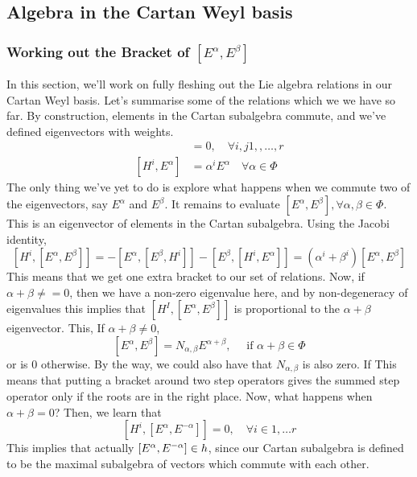 \subsection{Algebra in the Cartan Weyl basis}

\subsubsection{Working out the Bracket of $ \left[  E ^ \alpha, E ^ \beta  \right]  $}
In this section, we'll work on fully fleshing 
out the Lie algebra relations in our Cartan Weyl basis. 
Let's summarise some of the relations which we we have so far. 
By construction, elements in the Cartan subalgebra commute, 
and we've defined eigenvectors with weights. 
\begin{align*}
	[ H ^ i , H ^ j ] &=  0 , \quad \forall i , j   1, , \dots, r  \\ 
	[ H ^ i , E ^ \alpha ] & = \alpha ^ i E ^ \alpha \quad \forall \alpha \in \Phi 
\end{align*}
The only thing we've yet to do 
is explore what happens when we 
commute two of the eigenvectors, say $  E^ \alpha$ and $ E ^ \beta $. 
It remains to evaluate $ [ E ^ \alpha , E ^ \beta ] , \forall \alpha, \beta \in \Phi$.
This is an eigenvector of elements in the Cartan subalgebra. 
Using the Jacobi identity, 
 \[
 [ H ^ i , [ E ^ \alpha, E ^ \beta ] ] =  - [ E ^ \alpha , [ E ^ \beta , H ^ i ]] - [ E ^ \beta , 
 [ H ^ i , E ^ \alpha ] ]  = ( \alpha ^ i + \beta ^ i ) [ E ^ \alpha , E ^ \beta ] 
\] 
This means that we get one extra bracket to our set of relations.
Now, if $ \alpha + \beta \neq  = 0  $, then we 
have a non-zero eigenvalue here, and by non-degeneracy of eigenvalues
this implies that $ \left[  H ^ I , \left[  E^ \alpha, E ^ \beta  \right]   \right]  $
is proportional to the $ \alpha + \beta $ eigenvector. This, 
If $ \alpha + \beta \neq 0 $, 
\[
 [ E ^ \alpha , E ^ \beta ] = N_{ \alpha, \beta  } E ^{ \alpha + \beta }, \quad \text{ if } 
  \alpha + \beta  \in \Phi 
\] or is $ 0 $ otherwise. By the way, 
we could also have that $ N_{ \alpha, \beta } $ is also zero. 
If This means that 
putting a bracket around two step operators 
gives the summed step operator only if the roots are in 
the right place. 
Now, what happens when $ \alpha + \beta  = 0 $? 
Then, we learn that 
\[
	[ H ^ i , [ E ^ \alpha , E ^{ - \alpha } ]]   = 0 , \quad \forall i \in 1, \dots r 
\] This implies that actually $ [ E ^ \alpha , E ^{ - \alpha } ] \in h $, 
since our Cartan subalgebra is defined to be the maximal 
subalgebra of vectors which commute with each other.


